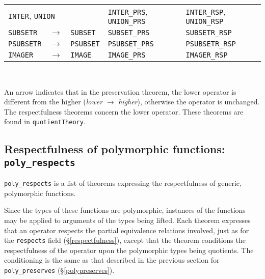 \documentclass[envcountsame,runningheads]{llncs}
\newcommand{\quotient}{partial equivalence}
\begin{document}
\begin{table}
\begin{center}
\begin{tabular}{|lll|l|l|}
\multicolumn{3}{|l|}{{\tt INTER}, {\tt UNION}}
  & {\tt INTER\_PRS}, {\tt UNION\_PRS} & {\tt INTER\_RSP}, {\tt UNION\_RSP} \\
{\tt SUBSETR} & $\rightarrow$ & {\tt SUBSET}
& {\tt SUBSET\_PRS} & {\tt SUBSETR\_RSP} \\
{\tt PSUBSETR} & $\rightarrow$ & {\tt PSUBSET}
& {\tt PSUBSET\_PRS} & {\tt PSUBSETR\_RSP} \\
{\tt IMAGER} & $\rightarrow$ & {\tt IMAGE}
& {\tt IMAGE\_PRS} & {\tt IMAGER\_RSP} \\
\hline
\end{tabular}
\\
\end{center}
An arrow indicates that in the
preservation theorem,
the lower operator is different
from the higher
({\it lower} $\rightarrow$ {\it higher}), otherwise the operator is unchanged.
The respectfulness theorems concern the lower operator.
These theorems are found in {\tt quotientTheory}.
\end{table}

%
\subsection{Respectfulness of polymorphic functions: {\tt poly\_respects}}
%
\label{polyrespects}

{\tt poly\_respects} is a list of theorems expressing the
respectfulness of generic, polymorphic functions.

Since the types of
these functions are polymorphic, instances of the functions may be applied 
to arguments of the types being lifted.
Each theorem expresses
that an operator respects the \quotient{} relations involved, just as
for the {\tt respects} field (\S\ref{respectfulness}),
except that the theorem conditions
the respectfulness of the operator upon the polymorphic types being
quotients.  The conditioning is the same as that described
in the previous section
for {\tt poly\_preserves} (\S\ref{polypreserves}).
\end{document}
